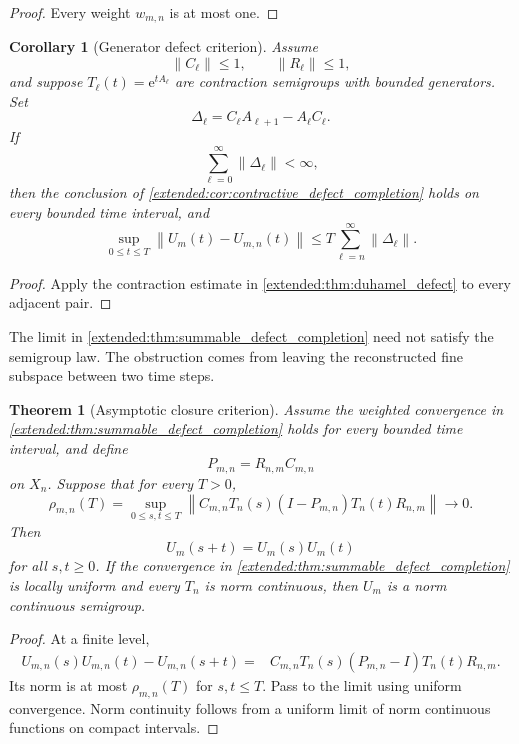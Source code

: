 \documentclass[11pt,letterpaper]{article}
\newtheorem{theorem}{Theorem}[section]
\theoremstyle{plain}
\theoremstyle{plain}
\theoremstyle{plain}
\newtheorem{corollary}[corollary]{Corollary}
\theoremstyle{definition}
\theoremstyle{definition}
\theoremstyle{definition}
\theoremstyle{definition}
\theoremstyle{definition}
\theoremstyle{remark}
\theoremstyle{remark}
\theoremstyle{remark}
\theoremstyle{remark}
\theoremstyle{remark}
\newcommand{\norm}[1]{\left\lVert#1\right\rVert}
\theoremstyle{remark}
\newcommand{\e}{\mathrm e}
\let\KomorebiPrimitivemathrm\mathrm
\renewcommand{\mathrm}[1]{{\KomorebiPrimitivemathrm{#1}}}
\begin{document}
\begin{proof}
Every weight \(w_{m,n}\) is at most one.
\end{proof}

\begin{corollary}[Generator defect criterion]\label{extended:record:021}\label{extended:cor:generator_defect_completion}
Assume
\[
\norm{C_\ell}\leq1,
\qquad
\norm{R_\ell}\leq1,
\]
and suppose \(T_\ell(t)=\e^{tA_\ell}\) are contraction semigroups with bounded generators. Set
\[
\Delta_\ell=C_\ell A_{\ell+1}-A_\ell C_\ell.
\]
If
\[
\sum_{\ell=0}^{\infty}\norm{\Delta_\ell}<\infty,
\]
then the conclusion of \cref{extended:cor:contractive_defect_completion} holds on every bounded time interval, and
\[
\sup_{0\leq t\leq T}
\norm{U_m(t)-U_{m,n}(t)}
\leq
T\sum_{\ell=n}^{\infty}\norm{\Delta_\ell}.
\]
\end{corollary}

\begin{proof}
Apply the contraction estimate in \cref{extended:thm:duhamel_defect} to every adjacent pair.
\end{proof}

The limit in \cref{extended:thm:summable_defect_completion} need not satisfy the semigroup law. The obstruction comes from leaving the reconstructed fine subspace between two time steps.

\begin{theorem}[Asymptotic closure criterion]\label{extended:record:022}\label{extended:thm:asymptotic_closure}
Assume the weighted convergence in \cref{extended:thm:summable_defect_completion} holds for every bounded time interval, and define
\[
P_{m,n}=R_{n,m}C_{m,n}
\]
on \(X_n\). Suppose that for every \(T>0\),
\[
\rho_{m,n}(T)
=
\sup_{0\leq s,t\leq T}
\norm{
C_{m,n}T_n(s)(I-P_{m,n})T_n(t)R_{n,m}
}
\longrightarrow0.
\]
Then
\[
U_m(s+t)=U_m(s)U_m(t)
\]
for all \(s,t\geq0\). If the convergence in \cref{extended:thm:summable_defect_completion} is locally uniform and every \(T_n\) is norm continuous, then \(U_m\) is a norm continuous semigroup.
\end{theorem}

\begin{proof}
At a finite level,
\[
\begin{aligned}
U_{m,n}(s)U_{m,n}(t)-U_{m,n}(s+t)
={}&
C_{m,n}T_n(s)
(P_{m,n}-I)
T_n(t)R_{n,m}.
\end{aligned}
\]
Its norm is at most \(\rho_{m,n}(T)\) for \(s,t\leq T\). Pass to the limit using uniform convergence. Norm continuity follows from a uniform limit of norm continuous functions on compact intervals.
\end{proof}
\end{document}
